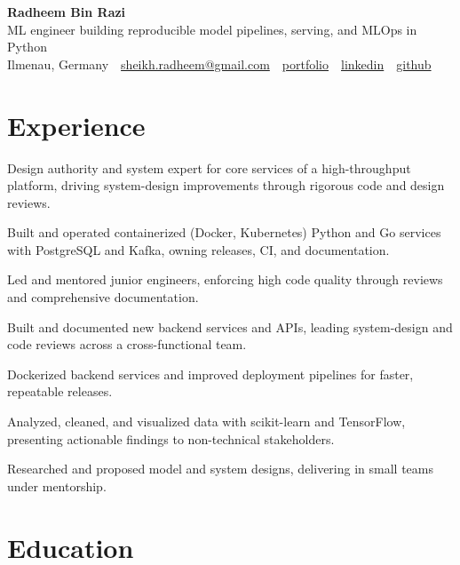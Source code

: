 \documentclass[11pt,a4paper]{resume}
\makeatletter
\newcommand{\Portfolio}{https://radheem.github.io/my-cv}
\newcommand{\PortfolioText}{portfolio}
\newcommand{\GitHub}{https://github.com/radheem}
\newcommand{\LinkedIn}{https://www.linkedin.com/in/radheem-razi}
\newcommand{\Email}{sheikh.radheem@gmail.com}
\makeatother
\begin{document}
\begin{center}
  {\huge\bfseries Radheem Bin Razi}\\[3pt]
  {\large ML engineer building reproducible model pipelines, serving, and MLOps in Python}\\[6pt]
  \small
  Ilmenau, Germany \,\textbar\,
  \href{mailto:\Email}{\Email} \,\textbar\,
  \href{\Portfolio}{\PortfolioText} \,\textbar\,
  \href{\LinkedIn}{linkedin} \,\textbar\,
  \href{\GitHub}{github}
\end{center}
\vspace{2pt}

\section{Experience}

\bullets
  \item Design authority and system expert for core services of a high-throughput platform, driving system-design improvements through rigorous code and design reviews.
  \item Built and operated containerized (Docker, Kubernetes) Python and Go services with PostgreSQL and Kafka, owning releases, CI, and documentation.
  \item Led and mentored junior engineers, enforcing high code quality through reviews and comprehensive documentation.
\bulletsend
\vspace{3pt}
\bullets
  \item Built and documented new backend services and APIs, leading system-design and code reviews across a cross-functional team.
  \item Dockerized backend services and improved deployment pipelines for faster, repeatable releases.
\bulletsend
\vspace{3pt}
\bullets
  \item Analyzed, cleaned, and visualized data with scikit-learn and TensorFlow, presenting actionable findings to non-technical stakeholders.
  \item Researched and proposed model and system designs, delivering in small teams under mentorship.
\bulletsend
\vspace{3pt}

\section{Education}
\end{document}
